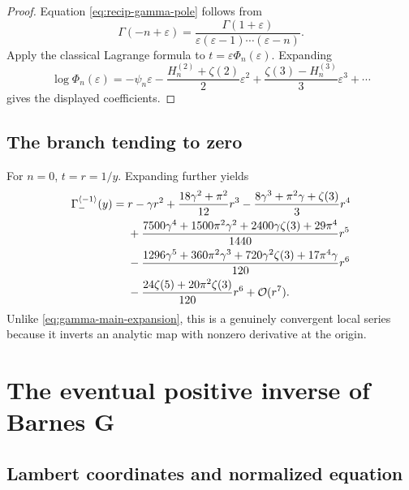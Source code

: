 \documentclass[11pt,a4paper]{article}
\numberwithin{equation}{section}
\theoremstyle{definition}
\theoremstyle{remark}
\newcommand{\Ord}{\mathcal O}
\newcommand{\cinv}{\langle-1\rangle}
\begin{document}
\begin{proof}
Equation \cref{eq:recip-gamma-pole} follows from
\[
 \Gamma(-n+\varepsilon)=
 \frac{\Gamma(1+\varepsilon)}
 {\varepsilon(\varepsilon-1)\cdots(\varepsilon-n)}.
\]
Apply the classical Lagrange formula to
\(t=\varepsilon\Phi_n(\varepsilon)\).  Expanding
\[
 \log\Phi_n(\varepsilon)
 =-\psi_n\varepsilon
 -\frac{H_n^{(2)}+\zeta(2)}2\varepsilon^2
 +\frac{\zeta(3)-H_n^{(3)}}3\varepsilon^3+\cdots
\]
gives the displayed coefficients.
\end{proof}

\subsection{The branch tending to zero}

For \(n=0\), \(t=r=1/y\).  Expanding further yields
\begin{align}
 \Gamma_-^{\cinv}(y)={}&r-\gamma r^2
 +\frac{18\gamma^2+\pi^2}{12}r^3
 -\frac{8\gamma^3+\pi^2\gamma+\zeta(3)}3r^4
 \notag\\
 &+\frac{7500\gamma^4+1500\pi^2\gamma^2
 +2400\gamma\zeta(3)+29\pi^4}{1440}r^5
 \notag\\
 &-\frac{1296\gamma^5+360\pi^2\gamma^3
 +720\gamma^2\zeta(3)+17\pi^4\gamma}{120}r^6
 \notag\\
 &-\frac{24\zeta(5)+20\pi^2\zeta(3)}{120}r^6
 +\Ord(r^7).
 \label{eq:gamma-left-expansion}
\end{align}
Unlike \cref{eq:gamma-main-expansion}, this is a genuinely convergent local
series because it inverts an analytic map with nonzero derivative at the
origin.

\section{The eventual positive inverse of Barnes G}

\subsection{Lambert coordinates and normalized equation}
\end{document}
